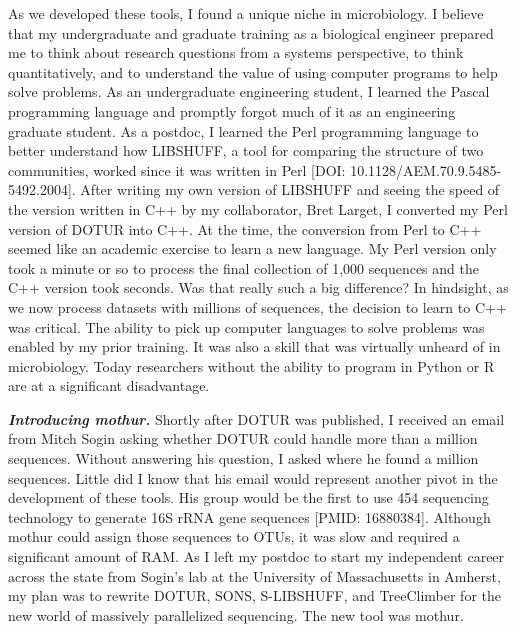 \documentclass[11pt,]{article}
\begin{document}
As we developed these tools, I found a unique niche in microbiology. I
believe that my undergraduate and graduate training as a biological
engineer prepared me to think about research questions from a systems
perspective, to think quantitatively, and to understand the value of
using computer programs to help solve problems. As an undergraduate
engineering student, I learned the Pascal programming language and
promptly forgot much of it as an engineering graduate student. As a
postdoc, I learned the Perl programming language to better understand
how LIBSHUFF, a tool for comparing the structure of two communities,
worked since it was written in Perl {[}DOI:
10.1128/AEM.70.9.5485-5492.2004{]}. After writing my own version of
LIBSHUFF and seeing the speed of the version written in C++ by my
collaborator, Bret Larget, I converted my Perl version of DOTUR into
C++. At the time, the conversion from Perl to C++ seemed like an
academic exercise to learn a new language. My Perl version only took a
minute or so to process the final collection of 1,000 sequences and the
C++ version took seconds. Was that really such a big difference? In
hindsight, as we now process datasets with millions of sequences, the
decision to learn to C++ was critical. The ability to pick up computer
languages to solve problems was enabled by my prior training. It was
also a skill that was virtually unheard of in microbiology. Today
researchers without the ability to program in Python or R are at a
significant disadvantage.

\textbf{\emph{Introducing mothur.}} Shortly after DOTUR was published, I
received an email from Mitch Sogin asking whether DOTUR could handle
more than a million sequences. Without answering his question, I asked
where he found a million sequences. Little did I know that his email
would represent another pivot in the development of these tools. His
group would be the first to use 454 sequencing technology to generate
16S rRNA gene sequences {[}PMID: 16880384{]}. Although mothur could
assign those sequences to OTUs, it was slow and required a significant
amount of RAM. As I left my postdoc to start my independent career
across the state from Sogin's lab at the University of Massachusetts in
Amherst, my plan was to rewrite DOTUR, SONS, S-LIBSHUFF, and TreeClimber
for the new world of massively parallelized sequencing. The new tool was
mothur.
\end{document}
